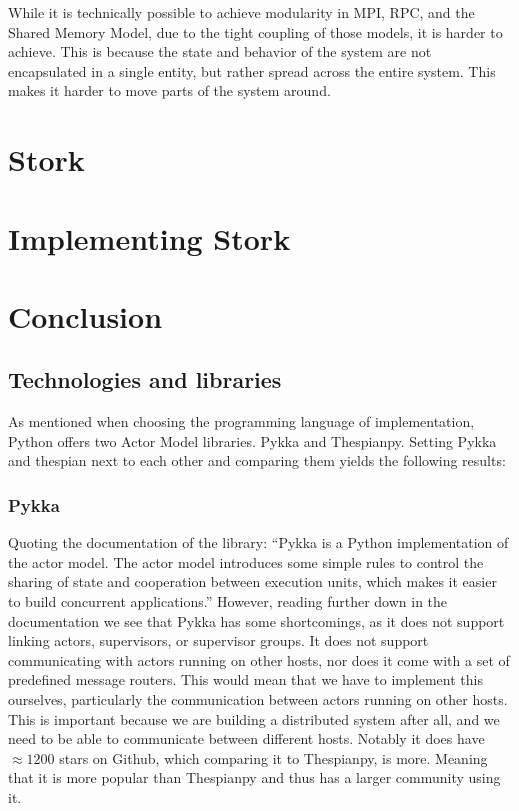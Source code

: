 \documentclass[a4paper]{article}
\begin{document}
While it is technically possible to achieve modularity in MPI, RPC, and the Shared Memory Model, due to the tight coupling of those models, it is harder to achieve. This is because the state and behavior of the system are not encapsulated in a single entity, but rather spread across the entire system. This makes it harder to move parts of the system around.
\section{Stork}
\section{Implementing Stork}
\section{Conclusion}

\subsection{Technologies and libraries}
As mentioned when choosing the programming language of implementation, Python offers two Actor Model libraries. Pykka and Thespianpy. Setting Pykka and thespian next to each other and comparing them yields the following results:
\subsubsection{Pykka}
Quoting the documentation of the library: \enquote{Pykka is a Python implementation of the actor model. The actor model introduces some simple rules to control the sharing of state and cooperation between execution units, which makes it easier to build concurrent applications.} However, reading further down in the documentation we see that Pykka has some shortcomings, as it does not support linking actors, supervisors, or supervisor groups. It does not support communicating with actors running on other hosts, nor does it come with a set of predefined message routers. This would mean that we have to implement this ourselves, particularly the communication between actors running on other hosts. This is important because we are building a distributed system after all, and we need to be able to communicate between different hosts. Notably it does have \(\approx 1200\) stars on Github, which comparing it to Thespianpy, is more. Meaning that it is more popular than Thespianpy and thus has a larger community using it.
\end{document}
